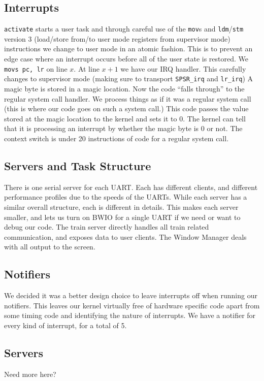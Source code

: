 \documentclass{article}
\begin{document}
\subsection{Interrupts}
\texttt{activate} starts a user task and through careful use of the
\texttt{mov}s and \texttt{ldm}/\texttt{stm} version 3 (load/store from/to user
mode registers from supervisor mode) instructions we change to user mode in an
atomic fashion. This is to prevent an edge case where an interrupt occurs before
all of the user state is restored. We \texttt{movs pc, lr} on line $x$. At line
$x + 1$ we have our IRQ handler. This carefully changes to supervisor mode
(making sure to transport \texttt{SPSR\_irq} and \texttt{lr\_irq}) A magic byte
is stored in a magic location. Now the code ``falls through'' to the regular
system call handler.  We process things as if it was a regular system call (this
is where our code goes on such a system call.) This code passes the value stored
at the magic location to the kernel and sets it to 0. The kernel can tell that
it is processing an interrupt by whether the magic byte is 0 or not.  The
context switch is under 20 instructions of code for a regular system call.

\subsection{Servers and Task Structure}
There is one serial server for each UART. Each has different clients, and
different performance profiles due to the speeds of the UARTs. While each server
has a similar overall structure, each is different in details. This makes each
server smaller, and lets us turn on BWIO for a single UART if we need or want to
debug our code. The train server directly handles all train related
communication, and exposes data to user clients. The Window Manager deals with
all output to the screen.

\subsection{Notifiers}
We decided it was a better design choice to leave interrupts off when running
our notifiers. This leaves our kernel virtually free of hardware specific code
apart from some timing code and identifying the nature of interrupts. We have a
notifier for every kind of interrupt, for a total of 5.

\subsection{Servers}
Need more here?
\end{document}
